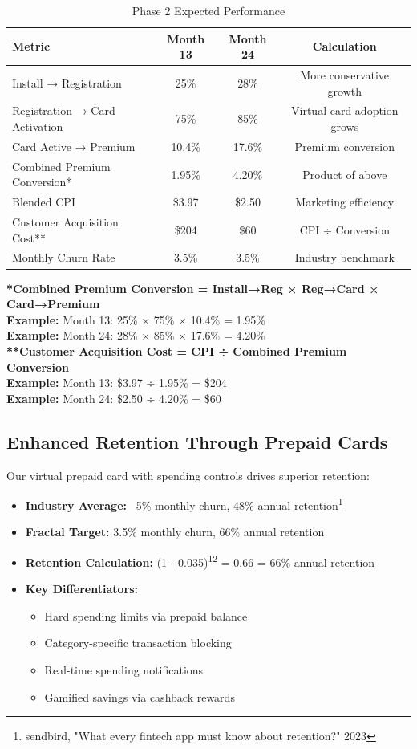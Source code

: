 \documentclass[11pt,letterpaper]{article}
\begin{document}
\begin{table}[h]
\centering
\caption{Phase 2 Expected Performance}
\begin{tabular}{|l|c|c|c|}
\hline
\textbf{Metric} & \textbf{Month 13} & \textbf{Month 24} & \textbf{Calculation} \\
\hline
Install → Registration & 25\% & 28\% & More conservative growth \\
Registration → Card Activation & 75\% & 85\% & Virtual card adoption grows \\
Card Active → Premium & 10.4\% & 17.6\% & Premium conversion \\
Combined Premium Conversion* & 1.95\% & 4.20\% & Product of above \\
Blended CPI & \$3.97 & \$2.50 & Marketing efficiency \\
Customer Acquisition Cost** & \$204 & \$60 & CPI ÷ Conversion \\
Monthly Churn Rate & 3.5\% & 3.5\% & Industry benchmark \\
\hline
\end{tabular}
\end{table}

\textbf{*Combined Premium Conversion = Install→Reg × Reg→Card × Card→Premium}\\
\textbf{Example:} Month 13: 25\% × 75\% × 10.4\% = 1.95\%\\
\textbf{Example:} Month 24: 28\% × 85\% × 17.6\% = 4.20\%\\
\textbf{**Customer Acquisition Cost = CPI ÷ Combined Premium Conversion}\\
\textbf{Example:} Month 13: \$3.97 ÷ 1.95\% = \$204\\
\textbf{Example:} Month 24: \$2.50 ÷ 4.20\% = \$60

\subsection{Enhanced Retention Through Prepaid Cards}

Our virtual prepaid card with spending controls drives superior retention:

\begin{itemize}
\item \textbf{Industry Average:} ~5\% monthly churn, 48\% annual retention\footnote{sendbird, "What every fintech app must know about retention?" 2023}
\item \textbf{Fractal Target:} 3.5\% monthly churn, 66\% annual retention
\item \textbf{Retention Calculation:} (1 - 0.035)\textsuperscript{12} = 0.66 = 66\% annual retention
\item \textbf{Key Differentiators:}
\begin{itemize}
\item Hard spending limits via prepaid balance
\item Category-specific transaction blocking
\item Real-time spending notifications
\item Gamified savings via cashback rewards
\end{itemize}
\end{itemize}
\end{document}

